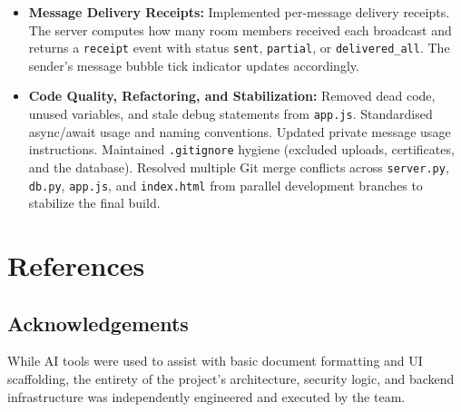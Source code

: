 \documentclass[12pt, a4paper]{article}
\begin{document}
\begin{itemize}[leftmargin=*]
    \item \textbf{Message Delivery Receipts:} Implemented per-message delivery receipts. The server computes how many room members received each broadcast and returns a \texttt{receipt} event with status \texttt{sent}, \texttt{partial}, or \texttt{delivered\_all}. The sender's message bubble tick indicator updates accordingly.

    \item \textbf{Code Quality, Refactoring, and Stabilization:} Removed dead code, unused variables, and stale debug statements from \texttt{app.js}. Standardised async/await usage and naming conventions. Updated private message usage instructions. Maintained \texttt{.gitignore} hygiene (excluded uploads, certificates, and the database). Resolved multiple Git merge conflicts across \texttt{server.py}, \texttt{db.py}, \texttt{app.js}, and \texttt{index.html} from parallel development branches to stabilize the final build.
\end{itemize}

\section{References}
\subsection*{Acknowledgements}
While AI tools were used to assist with basic document formatting and UI scaffolding, the entirety of the project's architecture, security logic, and backend infrastructure was independently engineered and executed by the team.
\end{document}
